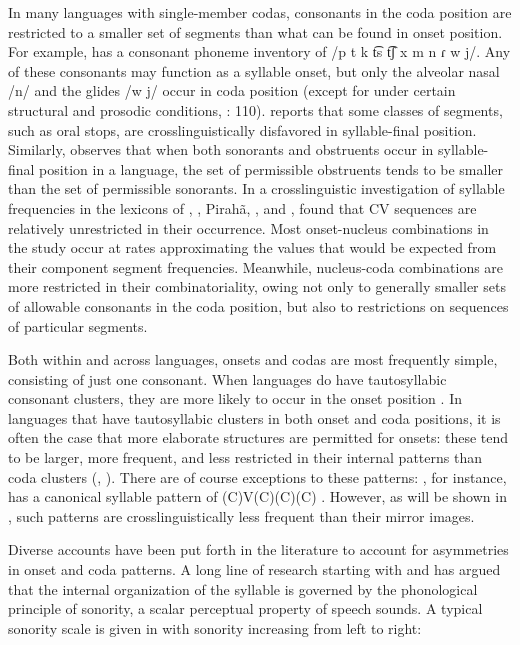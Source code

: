   In many languages with single-member codas, consonants in the coda position are restricted to a smaller set of segments than what can be found in onset position. For example,  has a consonant phoneme inventory of /p t k t͡s t͡ʃ x m n ɾ w j/. Any of these consonants may function as a syllable onset, but only the alveolar nasal /n/ and the glides /w j/ occur in coda position (except for under certain structural and prosodic conditions,  \citealt{VallejosYopán2010}: 110). \citet{Krakow1999} reports that some classes of segments, such as oral stops, are crosslinguistically disfavored in syllable-final position. Similarly, \citet[301]{Clements1990} observes that when both sonorants and obstruents occur in syllable-final position in a language, the set of permissible obstruents tends to be smaller than the set of permissible sonorants. In a crosslinguistic investigation of syllable frequencies in the lexicons of , , Pirahã, , and , \citet{MaddiesonPrecoda1992} found that CV sequences are relatively unrestricted in their occurrence. Most onset-nucleus combinations in the study occur at rates approximating the values that would be expected from their component segment frequencies. Meanwhile, nucleus-coda combinations are more restricted in their combinatoriality, owing not only to generally smaller sets of allowable consonants in the coda position, but also to restrictions on sequences of particular segments.

  Both within and across languages, onsets and codas are most frequently simple, consisting of just one consonant. When languages do have tautosyllabic consonant clusters, they are more likely to occur in the onset position \citep{Blevins2006}. In languages that have tautosyllabic clusters in both onset and coda positions, it is often the case that more elaborate structures are permitted for onsets: these tend to be larger, more frequent, and less restricted in their internal patterns than coda clusters (\citealt{Greenberg19651978}, \citealt{Blevins2006}). There are of course exceptions to these patterns: , for instance, has a canonical syllable pattern of (C)V(C)(C)(C) \citep{Beachy2005}. However, as will be shown in , such patterns are crosslinguistically less frequent than their mirror images.

  Diverse accounts have been put forth in the literature to account for asymmetries in onset and coda patterns. A long line of research starting with \citet{Sievers1881} and \citet{Jespersen1904} has argued that the internal organization of the syllable is governed by the phonological principle of sonority, a scalar perceptual property of speech sounds. A typical sonority scale is given in  with sonority increasing from left to right:


